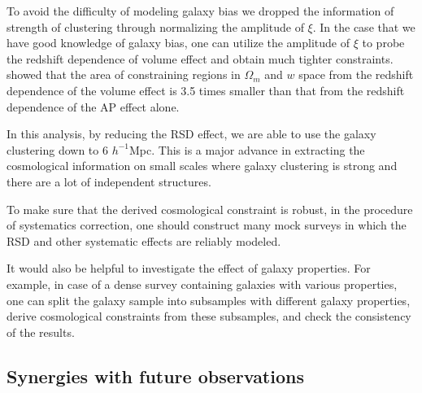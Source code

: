 \documentclass[iop]{emulateapj}
\begin{document}
To avoid the difficulty of modeling galaxy bias we dropped the information of strength of clustering
through normalizing the amplitude of $\xi$.
In the case that we have good knowledge of galaxy bias, one can utilize the amplitude of $\xi$ to probe the redshift dependence of volume effect 
and obtain much tighter constraints.
\cite{Li2015} showed that
the area of constraining regions in $\Omega_m$ and $w$ space from the redshift dependence of the volume effect is 3.5 times smaller 
than that from the redshift dependence of the AP effect alone.

In this analysis, by reducing the RSD effect, 
we are able to use the galaxy clustering down to 6 $h^{-1}$Mpc.
This is a major advance in extracting the cosmological information 
on small scales where galaxy clustering is strong
and there are a lot of independent structures.

To make sure that the derived cosmological constraint is robust, 
in the procedure of systematics correction, 
one should construct many mock surveys in which the RSD and other systematic effects are reliably modeled.

It would also be helpful to investigate the effect of galaxy properties.
For example, in case of a dense survey containing galaxies with various properties, 
one can split the galaxy sample into subsamples with different galaxy properties, 
derive cosmological constraints from these subsamples, 
and check the consistency of the results. 



\subsection{Synergies with future observations}
\end{document}
